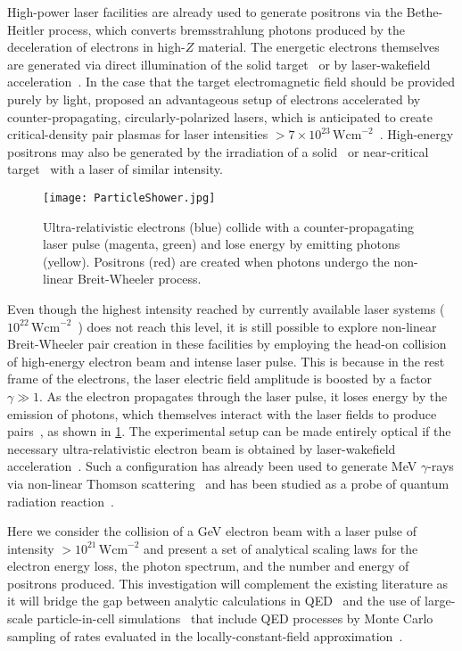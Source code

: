 \documentclass[reprint,superscriptaddress,amsmath,amssymb,aps,pra]{revtex4-1}
\newcommand{\Wcm}{\mathrm{Wcm}}
\begin{document}
High-power laser facilities are already used to generate positrons
via the Bethe-Heitler process, which converts bremsstrahlung photons
produced by the deceleration of electrons in high-$Z$ material.
The energetic electrons themselves are generated via
direct illumination of the solid target~\cite{ChenExpt,ChenExpt2,LiangExpt}
or by laser-wakefield acceleration~\cite{GahnExpt,SarriExpt,SarriExpt2}.
In the case that the target electromagnetic field should be provided
purely by light, \citet{BellKirk} proposed an advantageous setup of
electrons accelerated by counter-propagating, circularly-polarized lasers,
which is anticipated to create critical-density pair plasmas for laser
intensities $>7\times10^{23}\,\Wcm^{-2}$~\cite{Duclous,Nerush,Elkina,Jirka,Grismayer}.
High-energy positrons may also be generated by the irradiation of a
solid~\cite{Ridgers} or near-critical target~\cite{Brady,Zhu}
with a laser of similar intensity.

	\begin{figure}
	\texttt{[image: ParticleShower.jpg]}
	\caption[Particle shower]
		{Ultra-relativistic electrons (blue) collide with a
		counter-propagating laser pulse
		(magenta, green) and lose energy by emitting photons (yellow).
		Positrons (red) are created when photons undergo
		the non-linear Breit-Wheeler process.}
	\label{fig:shower}
	\end{figure}

Even though the highest intensity reached by currently available laser
systems ($10^{22}\,\Wcm^{-2}$~\cite{Hercules}) does not reach this level,
it is still possible to explore non-linear Breit-Wheeler pair creation
in these facilities by employing the head-on collision of high-energy
electron beam and intense laser pulse. This is because in the rest frame
of the electrons, the laser electric field amplitude is boosted by a
factor $\gamma \gg 1$. As the electron propagates through the laser pulse,
it loses energy by the emission of photons, which themselves interact
with the laser fields to produce pairs~\cite{Sokolov,Bulanov}, as shown
in \cref{fig:shower}. The experimental setup can be made entirely optical if
the necessary ultra-relativistic electron beam is obtained by
laser-wakefield acceleration~\cite{Wang,Kim,Leemans}. Such a configuration
has already been used to generate MeV $\gamma$-rays via non-linear
Thomson scattering~\cite{ChenS,SarriBeams} and has been studied as a
probe of quantum radiation reaction~\cite{Neitz,Blackburn,Dinu,Vranic}.

Here we consider the collision of a GeV electron beam with a laser pulse
of intensity $>10^{21}\,\Wcm^{-2}$ and present a set of analytical
scaling laws for the electron energy loss, the photon spectrum, and
the number and energy of positrons produced. This investigation will
complement the existing literature as it will bridge the gap between
analytic calculations in QED~\cite{Heinzl,King,Krajewska,Dinu:2013gaa,Meuren,Meuren2,DiPiazza,DiPiazza2}
and the use of large-scale particle-in-cell simulations~\cite{Mironov,Lobet}
that include QED processes by Monte Carlo sampling of rates
evaluated in the locally-constant-field approximation~\cite{RidgersJCP,Gonoskov}.
\end{document}
